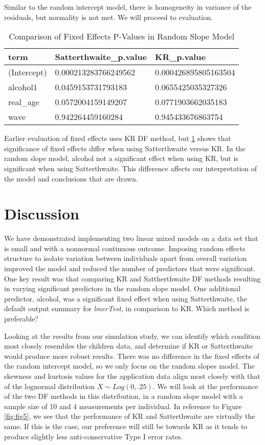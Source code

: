 \documentclass[12pt, twoside]{amherstthesis}
\begin{document}
Similar to the random intercept model, there is homogeneity in variance of the residuals, but normality is not met. We will proceed to evaluation.
\begin{table}[H]

\caption{\label{tab:compareslope}Comparison of Fixed Effects P-Values in Random Slope Model}
\centering
\begin{tabular}[t]{l|l|l}
\hline
term & Satterthwaite\_p.value & KR\_p.value\\
\hline
(Intercept) & 0.000213283766249562 & 0.000426895805163504\\
\hline
alcohol1 & 0.0459153731793183 & 0.0655425035327326\\
\hline
real\_age & 0.0572004159149207 & 0.0771903662035183\\
\hline
wave & 0.942264459160284 & 0.945433676863754\\
\hline
\end{tabular}
\end{table}
Earlier evaluation of fixed effects uses KR DF method, but \ref{tab:compareslope} shows that significance of fixed effects differ when using Satterthwaite versus KR. In the random slope model, alcohol not a significant effect when using KR, but is significant when using Satterthwaite. This difference affects our interpretation of the model and conclusions that are drawn.

\hypertarget{discussion-1}{%
\section{Discussion}\label{discussion-1}}

We have demonstrated implementing two linear mixed models on a data set that is small and with a nonnormal continuous outcome. Imposing random effects structure to isolate variation between individuals apart from overall variation improved the model and reduced the number of predictors that were significant. One key result was that comparing KR and Sattherthwaite DF methods resulting in varying significant predictors in the random slope model. One additional predictor, alcohol, was a significant fixed effect when using Satterthwaite, the default output summary for \emph{lmerTest}, in comparison to KR. Which method is preferable?

Looking at the results from our simulation study, we can identify which condition most closely resembles the children data, and determine if KR or Satterthwaite would produce more robust results. There was no difference in the fixed effects of the random intercept model, so we only focus on the random slopes model. The skewness and kurtosis values for the application data align most closely with that of the lognormal distribution \(X\sim\mathit{Log}(0,.25).\) We will look at the performance of the two DF methods in this distribution, in a random slope model with a sample size of 10 and 4 measurements per individual. In reference to Figure \ref{fig:fig5}, we see that the performance of KR and Satterthwaite are virtually the same. If this is the case, our preference will still be towards KR as it tends to produce slightly less anti-conservative Type I error rates.
\end{document}

